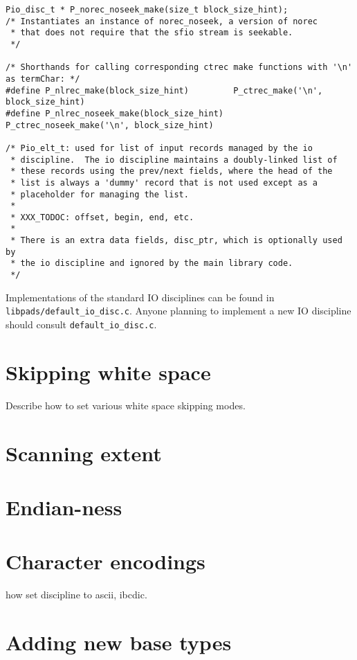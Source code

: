 \begin{verbatim}
Pio_disc_t * P_norec_noseek_make(size_t block_size_hint);
/* Instantiates an instance of norec_noseek, a version of norec
 * that does not require that the sfio stream is seekable.
 */

/* Shorthands for calling corresponding ctrec make functions with '\n' as termChar: */
#define P_nlrec_make(block_size_hint)         P_ctrec_make('\n', block_size_hint)
#define P_nlrec_noseek_make(block_size_hint)  P_ctrec_noseek_make('\n', block_size_hint)

/* Pio_elt_t: used for list of input records managed by the io
 * discipline.  The io discipline maintains a doubly-linked list of
 * these records using the prev/next fields, where the head of the
 * list is always a 'dummy' record that is not used except as a
 * placeholder for managing the list.
 * 
 * XXX_TODOC: offset, begin, end, etc.
 *
 * There is an extra data fields, disc_ptr, which is optionally used by
 * the io discipline and ignored by the main library code.
 */
\end{verbatim}

Implementations of the standard IO disciplines can be found in
\texttt{libpads/default\_io\_disc.c}.  Anyone planning to implement a new IO
discipline should consult \texttt{default\_io\_disc.c}.


\section{Skipping white space}
\label{sec:library-customization-white-space}
Describe how to set various white space skipping modes.

\section{Scanning extent}
\label{sec:library-customization-scanning-extent}

\section{Endian-ness}
\label{sec:library-customization-endian}

\section{Character encodings}
\label{sec:library-customization-character-encodings}
how set discipline to ascii, ibcdic.

\section{Adding new base types}
\label{sec:library-adding-new-base-types}
